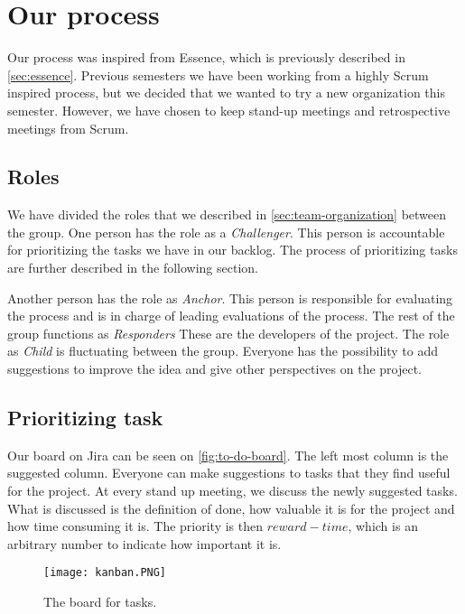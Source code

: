 \section{Our process}
Our process was inspired from Essence, which is previously described in \autoref{sec:essence}.
Previous semesters we have been working from a highly Scrum inspired process, but we decided that we wanted to try a new organization this semester.
However, we have chosen to keep stand-up meetings and retrospective meetings from Scrum.

\subsection{Roles}
We have divided the roles that we described in \autoref{sec:team-organization} between the group.
One person has the role as a \textit{Challenger}.
This person is accountable for prioritizing the tasks we have in our backlog.
The process of prioritizing tasks are further described in the following section.

Another person has the role as \textit{Anchor}.
This person is responsible for evaluating the process and is in charge of leading evaluations of the process.
The rest of the group functions as \textit{Responders}
These are the developers of the project.
The role as \textit{Child} is fluctuating between the group.
Everyone has the possibility to add suggestions to improve the idea and give other perspectives on the project.

\subsection{Prioritizing task}
Our board on Jira can be seen on \autoref{fig:to-do-board}.
The left most column is the suggested column.
Everyone can make suggestions to tasks that they find useful for the project.
At every stand up meeting, we discuss the newly suggested tasks.
What is discussed is the definition of done, how valuable it is for the project and how time consuming it is.
The priority is then $reward - time$, which is an arbitrary number to indicate how important it is.

\begin{figure}[H]
    \centering
    \texttt{[image: kanban.PNG]}
    \caption{The board for tasks.}
    \label{fig:to-do-board}
\end{figure}
